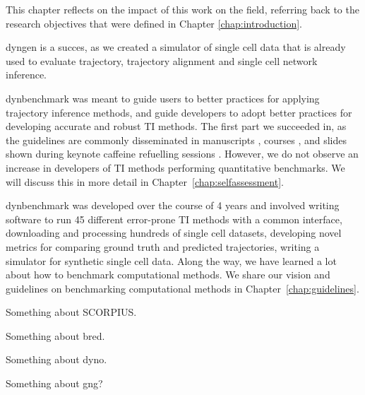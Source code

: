 
	
This chapter reflects on the impact of this work on the field, referring back to the research objectives that were defined in Chapter \ref{chap:introduction}. 
	
dyngen is a succes, as we created a simulator of single cell data that is already used to evaluate trajectory\cite{saelens_comparisonsinglecelltrajectory_2019}, trajectory alignment\cite{vandenberge_trajectorybaseddifferentialexpression_2019} and single cell network inference\cite{pratapa_benchmarkingalgorithmsgene_2019}.

dynbenchmark was meant to guide users to better practices for applying trajectory inference methods, and guide developers to adopt better practices for developing accurate and robust TI methods. The first part we succeeded in, as the guidelines are commonly disseminated in manuscripts \cite{lafzi_tutorialguidelinesexperimental_2018,luecken_currentbestpractices_2019}, courses \cite{kiselev_analysissinglecell_2019,martens_analysissinglecell_2019}, and slides shown during keynote caffeine refuelling sessions \cite{hemberg_coffeebreakanalysis_2019}. However, we do not observe an increase in developers of TI methods performing quantitative benchmarks. We will discuss this in more detail in Chapter~\ref{chap:selfassessment}.

dynbenchmark was developed over the course of 4 years and involved writing software to run 45 different error-prone TI methods with a common interface, downloading and processing hundreds of single cell datasets, developing novel metrics for comparing ground truth and predicted trajectories, writing a simulator for synthetic single cell data. Along the way, we have learned a lot about how to benchmark computational methods. We share our vision and guidelines on benchmarking computational methods in Chapter~\ref{chap:guidelines}.

Something about SCORPIUS.

Something about bred.

Something about dyno.

Something about gng?



